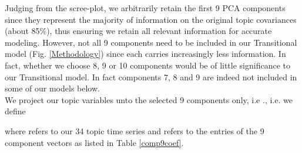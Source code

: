 \documentclass[10pt]{article}
\begin{document}
	Judging from the scree-plot, we arbitrarily retain the first 9 PCA components since they represent the majority of information on the original topic covariances (about 85\%), thus ensuring we retain all relevant information for accurate modeling. However, not all 9 components need to be included in our Transitional model (Fig. \ref{Methodology}) since each carries increasingly less information. In fact, whether we choose 8, 9 or 10 components would be of little significance to our Transitional model. In fact components 7, 8 and 9 are indeed not included in some of our models below.\\
	
	We project our topic variables unto the selected 9 components only, i.e ., i.e. we define 
	
	
	where  refers to our 34 topic time series and  refers to the entries of the 9 component vectors as listed in Table \ref{comp9coef}.\\
\end{document}

